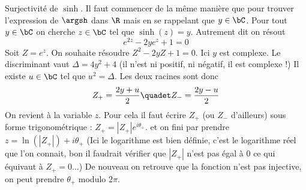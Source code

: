 \begin{correction}
\begin{enumerate}
\end{enumerate}


Surjectivité de $\sinh$. Il faut commencer de la même manière que pour trouver l'expression de $\argsh$ dans $\R$ mais en se rappelant que $y\in \bC$. Pour tout $y\in \bC$ on cherche $z\in \bC$ tel que $\sinh(z) =y$. Autrement dit on résout 
$$e^{2z}-2ye^{z} +1=0$$
Soit $Z=e^{z}$. On souhaite résoudre $Z^2 -2yZ+1=0$. 
Ici $y$ est complexe.  Le discriminant vaut $\Delta=4y^2+4$ (il n'est ni positif, ni négatif, il est complexe !) Il existe $u \in \bC$ tel que $u^2 =\Delta$. 
Les deux racines sont donc 
$$Z_+ = \frac{2y +u}{2} \quadet Z_- = \frac{2y-u}{2}$$
On revient à la variable $z$.  Pour cela il faut écrire 
$Z_+ $ (ou $Z_-$ d'ailleurs) sous forme trigonométrique : 
$Z_+ = |Z_+|e^{i\theta_+}$. 
et on fini par prendre $z = \ln(|Z_+|) +i\theta_+$
(Ici le logarithme est bien définie, c'est le logarithme réel que l'on connait, bon il faudrait vérifier que $|Z_+|$ n'est pas égal à 0 ce qui équivaut à $Z_+ =0$...) 
De nouveau on retrouve que la fonction n'est pas injective, on peut prendre $\theta_+ $ modulo $2\pi$. 
\end{correction}